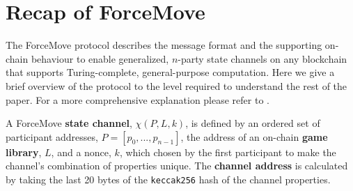 
\usepackage{stmaryrd}
\usepackage{mathtools}
\theoremstyle{definition}
\newtheorem{exmp}{Example}[section]

\newcommand{\adj}[1]{\llbracket #1 \rrbracket} 
\newcommand{\enf}[1]{[#1]} 



\maketitle

\section{Recap of ForceMove}

The ForceMove protocol describes the message format and the supporting on-chain behaviour
to enable generalized, $n$-party state channels on any blockchain that supports Turing-complete, general-purpose
computation. Here we give a brief overview of the protocol to the level required to understand
the rest of the paper. For a more comprehensive explanation please refer to \cite{}.

A ForceMove \textbf{state channel}, $\chi(P, L, k)$, is defined by an ordered set of participant
addresses, $P = [p_0, ..., p_{n-1}]$, the address of an on-chain \textbf{game library}, $L$,
and a nonce, $k$, which chosen by the first participant to make the channel's combination of properties unique.
The \textbf{channel address} is calculated by taking the last 20 bytes of the \texttt{keccak256}
hash of the channel properties. 


